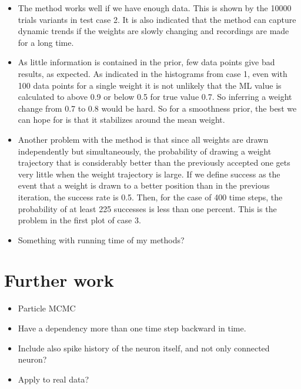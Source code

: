 \begin{itemize}
    \item The method works well if we have enough data. This is shown by the 10000 trials variants in test case 2. It is also indicated that the method can capture dynamic trends if the weights are slowly changing and recordings are made for a long time.
    \item As little information is contained in the prior, few data points give bad results, as expected. As indicated in the histograms from case 1, even with 100 data points for a single weight it is not unlikely that the ML value is calculated to above 0.9 or below 0.5 for true value 0.7. So inferring a weight change from 0.7 to 0.8 would be hard. So for a smoothness prior, the best we can hope for is that it stabilizes around the mean weight. 
    \item Another problem with the method is that since all weights are drawn independently but simultaneously, the probability of drawing a weight trajectory that is considerably better than the previously accepted one gets very little when the weight trajectory is large. If we define success as the event that a weight is drawn to a better position than in the previous iteration, the success rate is 0.5. Then, for the case of 400 time steps, the probability of at least 225 successes is less than one percent. This is the problem in the first plot of case 3.  
    \item Something with running time of my methods?
\end{itemize}



\section{Further work}
\label{sec:FW}
\begin{itemize}
    \item Particle MCMC
    \item Have a dependency more than one time step backward in time. 
    \item Include also spike history of the neuron itself, and not only connected neuron?
    \item Apply to real data?
    
\end{itemize}

